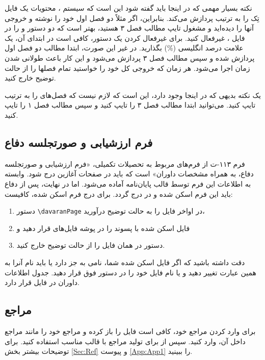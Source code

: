 نکته بسیار مهمی که در اینجا باید گفته شود این است که سیستم \lr{\TeX}، محتویات یک فایل تِک را به ترتیب پردازش می‌کند.  بنابراین، اگر مثلاً  دو فصل اول خود را نوشته و خروجی آنها را دیده‌اید و مشغول تایپ مطالب فصل ۳ هستید، بهتر است
که دو دستور 
\verb!!
و
\verb!!
را در فایل 
،
غیرفعال کنید.
برای غیرفعال کردن یک دستور، کافی است در ابتدای آن، یک علامت درصد انگلیسی (\%) بگذارید.
   در غیر این صورت، ابتدا مطالب دو فصل اول  پردازش شده و سپس مطالب فصل ۳ پردازش می‌شود و این کار باعث طولانی شدن زمان اجرا می‌شود. هر زمان که خروجی کل \پ خود را خواستید تمام فصلها را از حالت توضیح خارج کنید.


یک نکته بدیهی که در اینجا وجود دارد، این است که لازم نیست که فصل‌های \پ را به ترتیب تایپ کنید. می‌توانید ابتدا مطالب فصل ۳ را تایپ کنید و سپس مطالب فصل ۱ را تایپ کنید. 
\subsection{فرم ارزشیابی و صورتجلسه دفاع}
فرم ۱۱۳-ت از فرم‌های مربوط به تحصیلات تکمیلی، «فرم ارزشیابی و صورتجلسه دفاع، به همراه مشخصات داوران» است که باید در صفحات آغازین \پ درج شود.
وابسته به اطلاعات \پ این فرم توسط قالب پایان‌نامه آماده می‌شود. اما در نهایت، پس از دفاع باید این فرم اسکن شده و در \پ درج گردد.
برای درج فرم اسکن شده، کافیست:
\begin{enumerate}
\item
دستور 
\verb!\davaranPage!
در اواخر فایل
را به حالت توضیح درآورید،
\item
  فایل اسکن شده با پسوند 
را در پوشه فایل‌های \پ قرار دهید و
\item
دستور
\verb!!
در همان فایل را از حالت توضیح خارج کنید.
\end{enumerate}
دقت داشته باشید که اگر فایل اسکن شده شما، نامی به جز 
دارد یا باید نام آنرا به همین عبارت تغییر دهید و یا نام فایل خود را در  دستور فوق قرار دهید.
جدول اطلاعات داوران در فایل
قرار دارد.

\subsection{مراجع}
برای وارد کردن مراجع \پ خود، کافی است فایل 
را باز کرده و مراجع خود را مانند مراجع داخل آن، وارد کنید.  سپس از  برای تولید مراجع با قالب مناسب استفاده کنید. برای توضیحات بیشتر بخش \ref{Sec:Ref} و پیوست
\eqref{App:App1} را ببینید.


